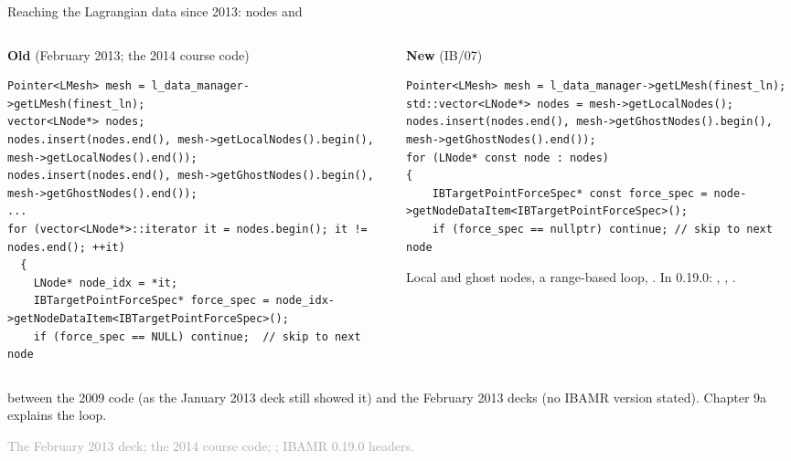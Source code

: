 \documentclass[aspectratio=169,11pt]{beamer}
\newcommand{\sourcecredit}[1]{\vfill\begin{flushright}\tiny\textcolor{DarkGray}{#1}\end{flushright}}
\begin{document}
\begin{frame}[fragile]{Reaching the Lagrangian data since 2013:  nodes and }
\label{fr:lmesh}
\begin{columns}[T,onlytextwidth]
\begin{column}{0.49\textwidth}
\textbf{Old} (February 2013; the 2014 course code)
\begin{lstlisting}[style=cpptiny]
Pointer<LMesh> mesh = l_data_manager->getLMesh(finest_ln);
vector<LNode*> nodes;
nodes.insert(nodes.end(), mesh->getLocalNodes().begin(), mesh->getLocalNodes().end());
nodes.insert(nodes.end(), mesh->getGhostNodes().begin(), mesh->getGhostNodes().end());
...
for (vector<LNode*>::iterator it = nodes.begin(); it != nodes.end(); ++it)
  {
    LNode* node_idx = *it;
    IBTargetPointForceSpec* force_spec = node_idx->getNodeDataItem<IBTargetPointForceSpec>();
    if (force_spec == NULL) continue;  // skip to next node
\end{lstlisting}
\end{column}
\begin{column}{0.49\textwidth}
\textbf{New} (IB/07)
\begin{lstlisting}[style=cpptiny]
Pointer<LMesh> mesh = l_data_manager->getLMesh(finest_ln);
std::vector<LNode*> nodes = mesh->getLocalNodes();
nodes.insert(nodes.end(), mesh->getGhostNodes().begin(), mesh->getGhostNodes().end());
for (LNode* const node : nodes)
{
    IBTargetPointForceSpec* const force_spec = node->getNodeDataItem<IBTargetPointForceSpec>();
    if (force_spec == nullptr) continue; // skip to next node
\end{lstlisting}
\footnotesize Local and ghost nodes, a range-based loop, . In 0.19.0:  ,  , .
\end{column}
\end{columns}
\vspace{1mm}
\footnotesize {} between the 2009 code (as the January 2013 deck still showed it) and the February 2013 decks (no IBAMR version stated). Chapter 9a explains the loop.
\sourcecredit{The February 2013 deck; the 2014 course code; \code{examples/IB/07-moving-plates}; IBAMR 0.19.0 headers.}
\end{frame}
\end{document}
